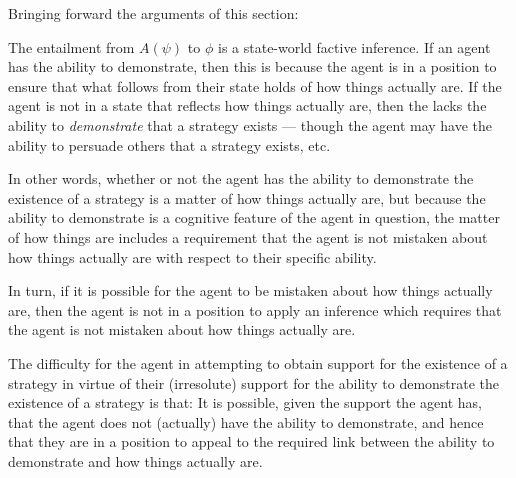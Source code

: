 \documentclass[10pt]{article}
\begin{document}
\begin{note}
  Bringing forward the arguments of this section:

  The entailment from \(A(\psi)\) to \(\phi\) is a state-world factive inference.
  If an agent has the ability to demonstrate, then this is because the agent is in a position to ensure that what follows from their state holds of how things actually are.
  If the agent is not in a state that reflects how things actually are, then the lacks the ability to \emph{demonstrate} that a strategy exists --- though the agent may have the ability to persuade others that a strategy exists, etc.

  In other words, whether or not the agent has the ability to demonstrate the existence of a strategy is a matter of how things actually are, but because the ability to demonstrate is a cognitive feature of the agent in question, the matter of how things are includes a requirement that the agent is not mistaken about how things actually are with respect to their specific ability.

  In turn, if it is possible for the agent to be mistaken about how things actually are, then the agent is not in a position to apply an inference which requires that the agent is not mistaken about how things actually are.

  The difficulty for the agent in attempting to obtain support for the existence of a strategy in virtue of their (irresolute) support for the ability to demonstrate the existence of a strategy is that:
  It is possible, given the support the agent has, that the agent does not (actually) have the ability to demonstrate, and hence that they are in a position to appeal to the required link between the ability to demonstrate and how things actually are.
\end{note}
\end{document}
